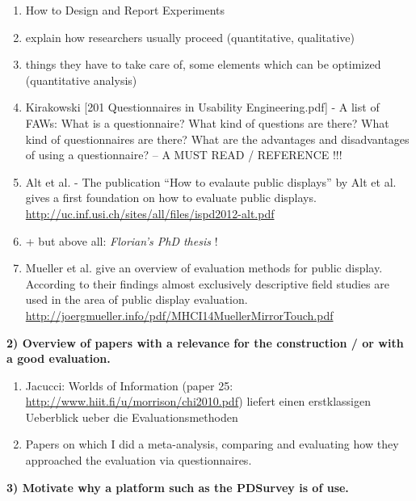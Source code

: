 		\begin{enumerate}
		\item How to Design and Report Experiments \cite{field2003design}
		\item explain how researchers usually proceed (quantitative, qualitative)
		\item things they have to take care of, some elements which can be optimized (quantitative analysis)


		\item Kirakowski [201 Questionnaires in Usability Engineering.pdf] - A list of FAWs: What is a questionnaire? What kind of questions are there? What kind of questionnaires are there? What are the advantages and disadvantages of using a questionnaire? 		--   A MUST READ / REFERENCE !!!



		\item Alt et al. \cite{Alt2012HowToEvaluate}  -  The publication ``How to evalaute public displays'' by Alt et al. gives a first foundation on how to evaluate public displays. \url{http://uc.inf.usi.ch/sites/all/files/ispd2012-alt.pdf} %
		\item + but above all: \textit{Florian's PhD thesis} \cite{alt2013thesis}!

		\item Mueller et al. \cite{muller2014mirrortouch} give an overview of evaluation methods for public display. According to their findings almost exclusively descriptive field studies are used in the area of public display evaluation. \url{http://joergmueller.info/pdf/MHCI14MuellerMirrorTouch.pdf}

		\end{enumerate}




	\textbf{2) Overview of papers with a relevance for the construction / or with a good evaluation.}

		\begin{enumerate}
		\item Jacucci: Worlds of Information (paper 25: \url{http://www.hiit.fi/u/morrison/chi2010.pdf}) liefert einen erstklassigen Ueberblick ueber die Evaluationsmethoden
		\item Papers on which I did a meta-analysis, comparing and evaluating how they approached the evaluation via questionnaires.
	\end{enumerate}




	\textbf{3) Motivate why a platform such as the PDSurvey is of use. }

